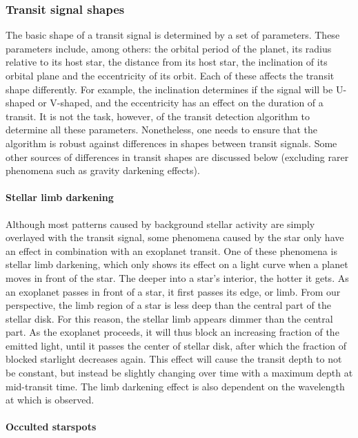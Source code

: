 \subsubsection{Transit signal shapes}
\label{sec:transit_shapes}

The basic shape of a transit signal is determined by a set of parameters. These parameters include, among others: the orbital period of the planet, its radius relative to its host star, the distance from its host star, the inclination of its orbital plane and the eccentricity of its orbit. Each of these affects the transit shape differently. For example, the inclination determines if the signal will be U-shaped or V-shaped, and the eccentricity has an effect on the duration of a transit. It is not the task, however, of the transit detection algorithm to determine all these parameters. Nonetheless, one needs to ensure that the algorithm is robust against differences in shapes between transit signals. Some other sources of differences in transit shapes are discussed below (excluding rarer phenomena such as gravity darkening effects).

\paragraph{Stellar limb darkening}

Although most patterns caused by background stellar activity are simply overlayed with the transit signal, some phenomena caused by the star only have an effect in combination with an exoplanet transit. One of these phenomena is stellar limb darkening, which only shows its effect on a light curve when a planet moves in front of the star. The deeper into a star's interior, the hotter it gets. As an exoplanet passes in front of a star, it first passes its edge, or limb. From our perspective, the limb region of a star is less deep than the central part of the stellar disk. For this reason, the stellar limb appears dimmer than the central part. As the exoplanet proceeds, it will thus block an increasing fraction of the emitted light, until it passes the center of stellar disk, after which the fraction of blocked starlight decreases again. This effect will cause the transit depth to not be constant, but instead be slightly changing over time with a maximum depth at mid-transit time. The limb darkening effect is also dependent on the wavelength at which is observed. 

\paragraph{Occulted starspots}

